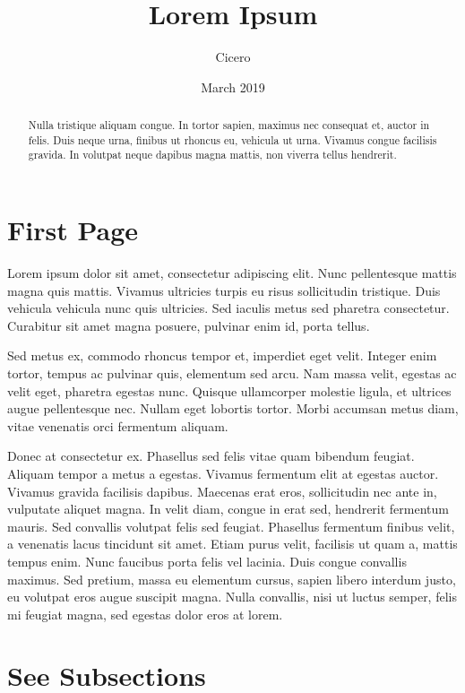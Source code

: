 \documentclass{article}
\title{Lorem Ipsum}
\author{Cicero}
\date{March 2019}
\begin{document}
\maketitle
\newpage
\tableofcontents
\newpage
\begin{abstract}
Nulla tristique aliquam congue. 
In tortor sapien, maximus nec consequat et, auctor in felis. 
Duis neque urna, finibus ut rhoncus eu, vehicula ut urna. 
Vivamus congue facilisis gravida. 
In volutpat neque dapibus magna mattis, non viverra tellus hendrerit. 
\end{abstract}

\section{First Page}

Lorem ipsum dolor sit amet, consectetur adipiscing elit. 
Nunc pellentesque mattis magna quis mattis. 
Vivamus ultricies turpis eu risus sollicitudin tristique. 
Duis vehicula vehicula nunc quis ultricies. 
Sed iaculis metus sed pharetra consectetur. 
Curabitur sit amet magna posuere, pulvinar enim id, porta tellus. 


Sed metus ex, commodo rhoncus tempor et, imperdiet eget velit. 
Integer enim tortor, tempus ac pulvinar quis, elementum sed arcu. 
Nam massa velit, egestas ac velit eget, pharetra egestas nunc. 
Quisque ullamcorper molestie ligula, et ultrices augue pellentesque nec. 
Nullam eget lobortis tortor. 
Morbi accumsan metus diam, vitae venenatis orci fermentum aliquam.


Donec at consectetur ex. 
Phasellus sed felis vitae quam bibendum feugiat. 
Aliquam tempor a metus a egestas. 
Vivamus fermentum elit at egestas auctor. 
Vivamus gravida facilisis dapibus. 
Maecenas erat eros, sollicitudin nec ante in, vulputate aliquet magna. 
In velit diam, congue in erat sed, hendrerit fermentum mauris. 
Sed convallis volutpat felis sed feugiat. 
Phasellus fermentum finibus velit, a venenatis lacus tincidunt sit amet. 
Etiam purus velit, facilisis ut quam a, mattis tempus enim. 
Nunc faucibus porta felis vel lacinia. 
Duis congue convallis maximus. 
Sed pretium, massa eu elementum cursus, sapien libero interdum justo, eu volutpat eros augue suscipit magna. 
Nulla convallis, nisi ut luctus semper, felis mi feugiat magna, sed egestas dolor eros at lorem.
\newpage
\section{See Subsections}
\end{document}
